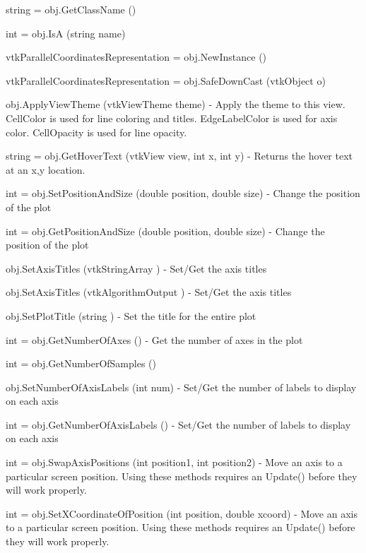 \begin{DoxyItemize}
\item {\ttfamily string = obj.\-Get\-Class\-Name ()}  
\item {\ttfamily int = obj.\-Is\-A (string name)}  
\item {\ttfamily vtk\-Parallel\-Coordinates\-Representation = obj.\-New\-Instance ()}  
\item {\ttfamily vtk\-Parallel\-Coordinates\-Representation = obj.\-Safe\-Down\-Cast (vtk\-Object o)}  
\item {\ttfamily obj.\-Apply\-View\-Theme (vtk\-View\-Theme theme)} -\/ Apply the theme to this view. Cell\-Color is used for line coloring and titles. Edge\-Label\-Color is used for axis color. Cell\-Opacity is used for line opacity.  
\item {\ttfamily string = obj.\-Get\-Hover\-Text (vtk\-View view, int x, int y)} -\/ Returns the hover text at an x,y location.  
\item {\ttfamily int = obj.\-Set\-Position\-And\-Size (double position, double size)} -\/ Change the position of the plot  
\item {\ttfamily int = obj.\-Get\-Position\-And\-Size (double position, double size)} -\/ Change the position of the plot  
\item {\ttfamily obj.\-Set\-Axis\-Titles (vtk\-String\-Array )} -\/ Set/\-Get the axis titles  
\item {\ttfamily obj.\-Set\-Axis\-Titles (vtk\-Algorithm\-Output )} -\/ Set/\-Get the axis titles  
\item {\ttfamily obj.\-Set\-Plot\-Title (string )} -\/ Set the title for the entire plot  
\item {\ttfamily int = obj.\-Get\-Number\-Of\-Axes ()} -\/ Get the number of axes in the plot  
\item {\ttfamily int = obj.\-Get\-Number\-Of\-Samples ()}  
\item {\ttfamily obj.\-Set\-Number\-Of\-Axis\-Labels (int num)} -\/ Set/\-Get the number of labels to display on each axis  
\item {\ttfamily int = obj.\-Get\-Number\-Of\-Axis\-Labels ()} -\/ Set/\-Get the number of labels to display on each axis  
\item {\ttfamily int = obj.\-Swap\-Axis\-Positions (int position1, int position2)} -\/ Move an axis to a particular screen position. Using these methods requires an Update() before they will work properly.  
\item {\ttfamily int = obj.\-Set\-X\-Coordinate\-Of\-Position (int position, double xcoord)} -\/ Move an axis to a particular screen position. Using these methods requires an Update() before they will work properly.  

\end{DoxyItemize}
